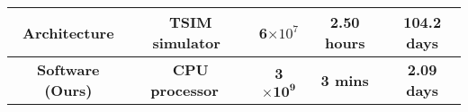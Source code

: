 \begin{table}[t!]
{\begin{tabular}{|c|c|c|c|c|}
Architecture               & TSIM simulator~\cite{danvek2013leon3}                                                              & 6$\times$$10^7$     & 2.50 hours                 & 104.2 days                    \\ \hline



\textbf{Software (Ours)}            & \textbf{CPU processor} ~\cite{yim2010measurement}                                                                     & \textbf{3$\mathbf{\times 10^9}$}     & \textbf{3 mins}                     & \textbf{2.09 days}                    \\ \hline

\end{tabular}
}
\label{tab:FI_compare}
\vspace{-5pt}
\end{table}
